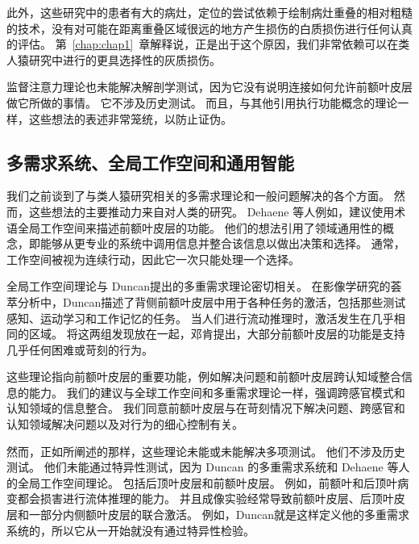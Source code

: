 此外，这些研究中的患者有大的病灶，定位的尝试依赖于绘制病灶重叠的相对粗糙的技术，没有对可能在距离重叠区域很远的地方产生损伤的白质损伤进行任何认真的评估。
第~\ref{chap:chap1}~章解释说，正是出于这个原因，我们非常依赖可以在类人猿研究中进行的更具选择性的灰质损伤。
\par


监督注意力理论也未能解决解剖学测试，因为它没有说明连接如何允许前额叶皮层做它所做的事情。
它不涉及历史测试。
而且，与其他引用执行功能概念的理论一样，这些想法的表述非常笼统，以防止证伪。



\subsection{多需求系统、全局工作空间和通用智能}

我们之前谈到了与类人猿研究相关的多需求理论和一般问题解决的各个方面。
然而，这些想法的主要推动力来自对人类的研究。
Dehaene 等人\cite{dehaene1998neuronal}例如，建议使用术语全局工作空间来描述前额叶皮层的功能。
他们的想法引用了领域通用性的概念，即能够从更专业的系统中调用信息并整合该信息以做出决策和选择。
通常，工作空间被视为连续行动，因此它一次只能处理一个选择。
\par


全局工作空间理论与 Duncan\cite{duncan2010multiple}提出的多重需求理论密切相关。
在影像学研究的荟萃分析中，Duncan\cite{duncan2000common}描述了背侧前额叶皮层中用于各种任务的激活，包括那些测试感知、运动学习和工作记忆的任务。
当人们进行流动推理时，激活发生在几乎相同的区域\cite{duncan2000common}。
将这两组发现放在一起，邓肯提出，大部分前额叶皮层的功能是支持几乎任何困难或苛刻的行为。
\par


这些理论指向前额叶皮层的重要功能，例如解决问题和前额叶皮层跨认知域整合信息的能力。
我们的建议与全球工作空间和多重需求理论一样，强调跨感官模式和认知领域的信息整合。
我们同意前额叶皮层与在苛刻情况下解决问题、跨感官和认知领域解决问题以及对行为的细心控制有关。
\par


然而，正如所阐述的那样，这些理论未能或未能解决多项测试。
他们不涉及历史测试。
他们未能通过特异性测试，因为 Duncan 的多重需求系统和 Dehaene 等人的全局工作空间理论。
包括后顶叶皮层和前额叶皮层。
例如，前额叶和后顶叶病变都会损害进行流体推理的能力\cite{woolgar2010fluid}。
并且成像实验经常导致前额叶皮层、后顶叶皮层和一部分内侧额叶皮层的联合激活。
例如，Duncan\cite{duncan2010multiple}就是这样定义他的多重需求系统的，所以它从一开始就没有通过特异性检验。
\par


